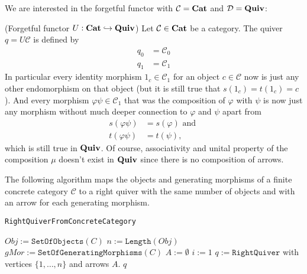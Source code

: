 \noindent We are interested in the forgetful functor with $\mathcal{C} = \mathrm{\textbf{Cat}}$ and $\mathcal{D} = \mathrm{\textbf{Quiv}}$:

\begin{example}{(Forgetful functor $U  : \mathrm{\textbf{Cat}} \hookrightarrow \mathrm{\textbf{Quiv}}$)}
Let $\mathcal{C} \in \mathrm{\textbf{Cat}}$ be a category. The quiver $q = U\mathcal{C}$ is defined by
\begin{align}
q_{0} &= \mathcal{C}_{0} \\
q_{1} &= \mathcal{C}_{1}
\end{align}
In particular every identity morphism $1_{c} \in \mathcal{C}_{1}$ for an object $c \in \mathcal{C}$ now is just any other endomorphism
on that object (but it is still true that $s(1_{c}) = t(1_{c}) = c$).
And every morphism $\varphi\psi \in \mathcal{C}_{1}$ that was the composition of $\varphi$ with $\psi$ is now just
any morphism without much deeper connection to $\varphi$ and $\psi$ apart from
\begin{align}
s(\varphi\psi) &= s(\varphi) \text{ and } \\
t(\varphi\psi) &= t(\psi),
\end{align}
which is still true in $\mathrm{\textbf{Quiv}}$. Of course, associativity and unital property of the composition $\mu$ doesn't exist in $\mathrm{\textbf{Quiv}}$ since there is no composition
of arrows.
\end{example}

The following algorithm maps the objects and generating morphisms of a finite concrete category $\mathcal{C}$ to a
right quiver with the same number of objects and with an arrow for each generating morphism. 

\begin{algorithm}[H]\capstart
    \caption{\texttt{RightQuiverFromConcreteCategory}}\label{algo:RightQuiverFromConcreteCategory}
	\BlankLine
	$Obj := \mathtt{SetOfObjects}(C)$\;
	$n := \mathtt{Length}(Obj)$\;
	$gMor := \mathtt{SetOfGeneratingMorphisms}(C)$\;
	$A := \emptyset$
	$i := 1$\;
	\BlankLine
	$q := \mathtt{RightQuiver}$ with vertices $\{1,\dots,n\}$ and arrows $A$.
	\BlankLine
	\Return $q$\;
\end{algorithm}

